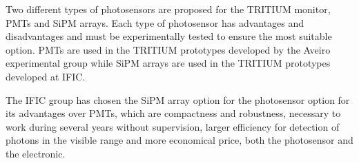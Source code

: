 Two different types of photosensors are proposed for the TRITIUM monitor, PMTs and SiPM arrays. Each type of photosensor has advantages and disadvantages and must be experimentally tested to ensure the most suitable option. PMTs are used in the TRITIUM prototypes developed by the Aveiro experimental group while SiPM arrays are used in the TRITIUM prototypes developed at IFIC.


The IFIC group has chosen the SiPM array option for the photosensor option for its advantages over PMTs, which are compactness and robustness, necessary to work during several years without supervision, larger efficiency for detection of photons in the visible range and more economical price, both the photosensor and the electronic. %